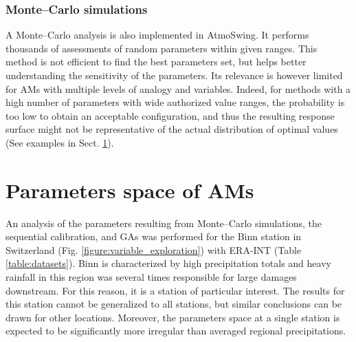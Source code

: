 \documentclass[review]{elsarticle}
\begin{document}
\subsubsection{Monte--Carlo simulations}
\label{sec:monte-carlo}

A Monte--Carlo analysis is also implemented in AtmoSwing. It performs thousands of assessments of random parameters within given ranges. This method is not efficient to find the best parameters set, but helps better understanding the sensitivity of the parameters. Its relevance is however limited for AMs with multiple levels of analogy and variables. Indeed, for methods with a high number of parameters with wide authorized value ranges, the probability is too low to obtain an acceptable configuration, and thus the resulting response surface might not be representative of the actual distribution of optimal values (See examples in Sect. \ref{sec:parameters-space}). 


\section{Parameters space of AMs}
\label{sec:parameters-space}

An analysis of the parameters resulting from Monte--Carlo simulations, the sequential calibration, and GAs was performed for the Binn station in Switzerland (Fig. \ref{figure:variable_exploration}) with ERA-INT (Table \ref{table:datasets}). Binn is characterized by high precipitation totals and heavy rainfall in this region was several times responsible for large damages downstream. For this reason, it is a station of particular interest. The results for this station cannot be generalized to all stations, but similar conclusions can be drawn for other locations. Moreover, the parameters space at a single station is expected to be significantly more irregular than averaged regional precipitations.
\end{document}
